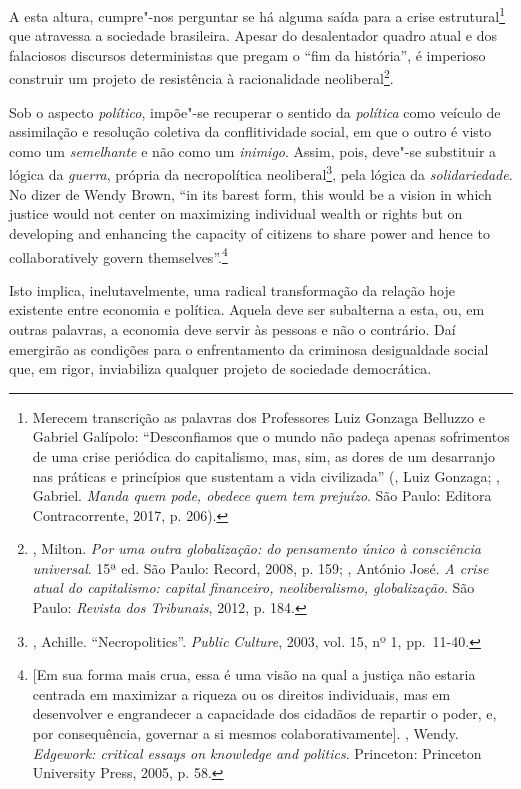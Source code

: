 A esta altura, cumpre"-nos perguntar se há alguma saída para a crise
estrutural\footnote{Merecem transcrição as palavras dos Professores Luiz
  Gonzaga Belluzzo e Gabriel Galípolo: ``Desconfiamos que o mundo não
  padeça apenas sofrimentos de uma crise periódica do capitalismo, mas,
  sim, as dores de um desarranjo nas práticas e princípios que sustentam
  a vida civilizada'' (, Luiz Gonzaga; , Gabriel.
  \emph{Manda quem pode, obedece quem tem prejuízo}. São Paulo: Editora
  Contracorrente, 2017, p. 206).} que atravessa a sociedade brasileira.
Apesar do desalentador quadro atual e dos falaciosos discursos
deterministas que pregam o ``fim da história'', é imperioso construir um
projeto de resistência à racionalidade neoliberal\footnote{,
  Milton. \emph{Por uma outra globalização: do pensamento único à
  consciência universal}. 15ª ed. São Paulo: Record, 2008, p. 159;
  , António José. \emph{A crise atual do capitalismo:
  capital financeiro, neoliberalismo, globalização}. São Paulo: \emph{Revista
    dos Tribunais}, 2012, p. 184.}.

Sob o aspecto \emph{político}, impõe"-se recuperar o sentido da
\emph{política} como veículo de assimilação e resolução coletiva da
conflitividade social, em que o outro é visto como um \emph{semelhante}
e não como um \emph{inimigo}. Assim, pois, deve"-se substituir a lógica
da \emph{guerra}, própria da necropolítica neoliberal\footnote{,
  Achille. ``Necropolitics''. \emph{Public} \emph{Culture}, 2003, vol.
  15, nº 1, pp.~11-40.}, pela lógica da \emph{solidariedade}. No dizer
de Wendy Brown, ``in its barest form, this would be a vision in which
justice would not center on maximizing individual wealth or rights but
on developing and enhancing the capacity of citizens to share power and
hence to collaboratively govern themselves''.\footnote{[Em sua forma mais
crua, essa é uma visão na qual a justiça não estaria centrada em maximizar
a riqueza ou os direitos individuais, mas em desenvolver e engrandecer
a capacidade dos cidadãos de repartir o poder, e, por consequência, governar
a si mesmos colaborativamente]. , Wendy.
  \emph{Edgework: critical essays on knowledge and politics}. Princeton:
  Princeton University Press, 2005, p. 58.}

Isto implica, inelutavelmente, uma radical transformação da relação hoje
existente entre economia e política. Aquela deve ser subalterna a esta,
ou, em outras palavras, a economia deve servir às pessoas e não o
contrário. Daí emergirão as condições para o enfrentamento da criminosa
desigualdade social que, em rigor, inviabiliza qualquer projeto de
sociedade democrática.


